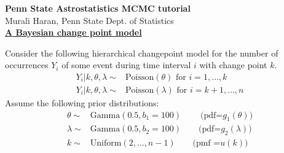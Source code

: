 \documentclass[11pt]{article}
\begin{document}
\pagestyle{empty}
\begin{center}
\Large
{\bf Penn State Astrostatistics MCMC tutorial}\\
\large
Murali Haran, Penn State Dept. of Statistics \\\vspace{0.2in}
{\bf  \underline{A Bayesian change point model}}\\
\end{center}
\normalsize
Consider the following hierarchical changepoint model for the number
of occurrences $Y_i$ of some event during time interval $i$ with change point $k$.
\begin{equation*}
\begin{split}
Y_i |k,\theta,\lambda \sim & \mbox{Poisson}(\theta) \mbox{ for } i=1,\dots,k\\
Y_i |k,\theta,\lambda \sim & \mbox{Poisson}(\lambda) \mbox{ for } i=k+1,\dots,n
\end{split}
\end{equation*}
Assume the following prior distributions:
\begin{equation*}
\begin{split}
 \theta \sim & \mbox{Gamma}(0.5,b_1 = 100)\:\:\:\:\:\:\:\:\:\:\mbox{(pdf=} g_1(\theta))\\
  \lambda \sim &  \mbox{Gamma}(0.5,b_2 = 100)\:\:\:\:\:\:\:\:\: \mbox{(pdf=} g_2(\lambda))\\
  k \sim & \mbox{Uniform}(2,\dots,n-1)\:\:\:\:\:\:\:\:\: \mbox{(pmf =} u(k))
\end{split}
\end{equation*}
\end{document}
